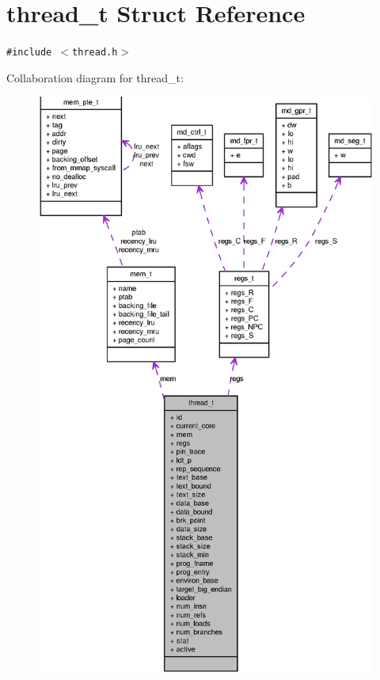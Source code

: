 \section{thread\_\-t Struct Reference}
\label{structthread__t}
{\tt \#include $<$thread.h$>$}

Collaboration diagram for thread\_\-t:\nopagebreak
\begin{figure}[H]
\begin{center}
\leavevmode
\includegraphics[width=400pt]{structthread__t__coll__graph}
\end{center}
\end{figure}
